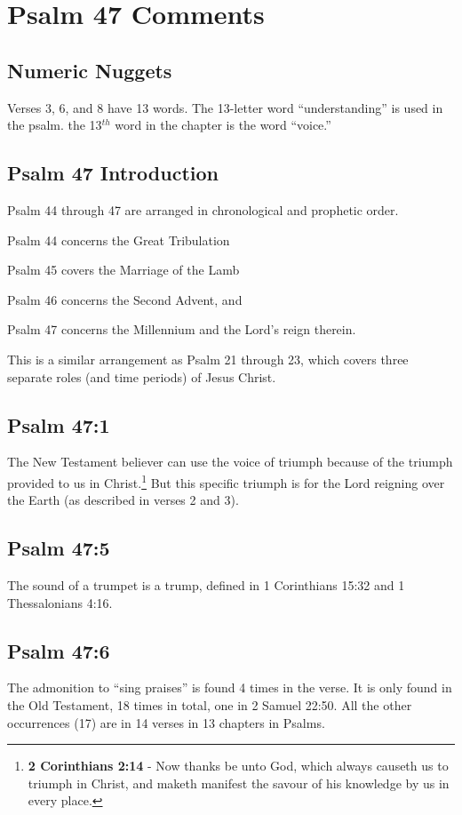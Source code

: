 \section{Psalm 47 Comments}

\subsection{Numeric Nuggets}
Verses 3, 6, and 8 have 13 words. The 13-letter word ``understanding'' is used in the psalm. the 13$^{th}$ word in the chapter is the word ``voice.''

\subsection{Psalm 47 Introduction}
Psalm 44 through 47 are arranged in chronological and prophetic order.
\begin{compactenum}
	\item Psalm 44 concerns the Great Tribulation
	\item Psalm 45 covers the Marriage of the Lamb
	\item Psalm 46 concerns the Second Advent, and
	\item Psalm 47 concerns the Millennium and the Lord's reign therein.\\
\end{compactenum}

\noindent This is a similar arrangement as Psalm 21 through 23, which covers three separate roles (and time periods) of Jesus Christ.

\subsection{Psalm 47:1}
The New Testament believer can use the voice of triumph because of the triumph provided to us in Christ.\footnote{\textbf{2 Corinthians 2:14} - Now thanks be unto God, which always causeth us to triumph in Christ, and maketh manifest the savour of his knowledge by us in every place.} But this specific triumph is for the Lord reigning over the Earth (as described in verses 2 and 3).

\subsection{Psalm 47:5}
The sound of a trumpet is a trump, defined in 1 Corinthians 15:32 and 1 Thessalonians 4:16.

\subsection{Psalm 47:6}
The admonition to ``sing praises'' is found 4 times in the verse.  It is only found in the Old Testament, 18 times in total, one in 2 Samuel 22:50. All the other occurrences (17) are in 14 verses in 13 chapters in Psalms.